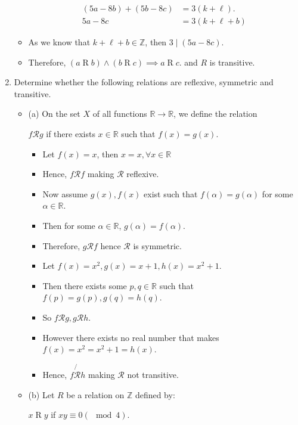 \documentclass[letterpaper,12pt]{article}
\begin{document}
\begin{enumerate}
\begin{itemize}
\begin{align}
	(5a-8b) + (5b-8c) &= 3(k+\ell). \\ 5a-8c &=3(k+\ell+b) 
\end{align} 
\item As we know that $k+\ell+b \in \mathbb{Z}$, then $3 \mid (5a-8c)$.
\item Therefore, $(a \mathrel R b) \wedge (b \mathrel R c) \implies a \mathrel R c$. and $R$ is transitive.
\end{itemize}
\item Determine whether the following relations are reflexive, symmetric and transitive.
\begin{itemize}
	\item (a) On the set $X$ of all functions $\mathbb{R} \rightarrow \mathbb{R}$, we define the relation
	\begin{center}
		$f \mathrel \mathcal{R} g$ if there exists $x \in \mathbb{R}$ such that $f(x) = g(x).$
	\end{center} 
	\begin{itemize}
	\item Let $f(x) =x$, then $x=x, \forall x \in \mathbb{R}$
	\item Hence, $f \mathrel \mathcal{R} f $ making $\mathcal R$ reflexive.
	\item Now assume $g(x),f(x) $ exist such that $f(\alpha) =g(\alpha)$ for some $\alpha \in \mathbb{R}$.
	\item Then for some $\alpha \in \mathbb{R}$, $g(\alpha) = f(\alpha)$.
	\item Therefore, $g \mathrel \mathcal R f$ hence $\mathcal R$ is symmetric.
	\item Let $f(x) = x^2, g(x) = x+1,h(x) =x^2+1$.
	\item Then there exists some $p,q \in \mathbb{R}$ such that $f(p) = g(p),g(q) =h(q)$.
	\item So $f \mathrel \mathcal R g,g \mathrel \mathcal R h$.
	\item However there exists no real number that makes $f(x) = x^2 = x^2+1 = h(x)$.
	\item Hence, $f  \not{\mathrel \mathcal R } h$ making $\mathcal R $ not transitive.
	\end{itemize}
	\item (b) Let $R$ be a relation on $\mathbb{Z}$ defined by:  
	\begin{center}
	$x \mathrel R y $ if $ xy \equiv 0 (\mod 4)$.	
	\end{center}
	\begin{itemize}

\end{itemize}
\end{itemize}
\end{enumerate}
\end{document}
